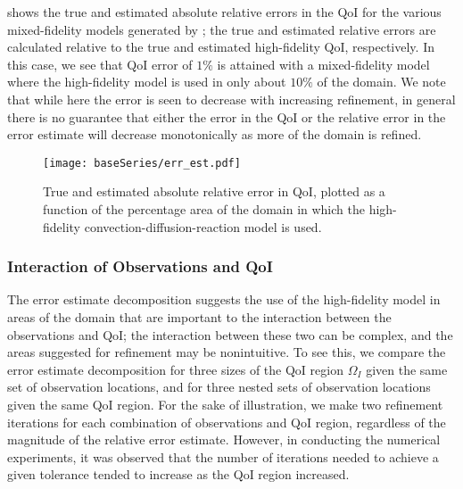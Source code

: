  shows the true and estimated absolute relative errors in the QoI for the various mixed-fidelity models generated by ; the true and estimated relative errors are calculated relative to the true and estimated high-fidelity QoI, respectively. In this case, we see that QoI error of $1\%$ is attained with a mixed-fidelity model where the high-fidelity model is used in only about $10\%$ of the domain. We note that while here the error is seen to decrease with increasing refinement, in general there is no guarantee that either the error in the QoI or the relative error in the error estimate will decrease monotonically as more of the domain is refined.
%
\begin{figure}[htbp]
\centering
\texttt{[image: baseSeries/err\_est.pdf]}
\caption{True and estimated absolute relative error in QoI, plotted as a function of the percentage area of the domain in which the high-fidelity convection-diffusion-reaction model is used.}
\label{fig:baseErr}
\end{figure}
%

\subsubsection{Interaction of Observations and QoI} \label{sec:qoivdata}
%
The error estimate decomposition suggests the use of the high-fidelity model in areas of the domain that are important to the interaction between the observations and QoI; the interaction between these two can be complex, and the areas suggested for refinement may be nonintuitive. To see this, we compare the error estimate decomposition for three sizes of the QoI region $\Omega_I$ given the same set of observation locations, and for three nested sets of observation locations given the same QoI region. For the sake of illustration, we make two refinement iterations for each combination of observations and QoI region, regardless of the magnitude of the relative error estimate. However, in conducting the numerical experiments, it was observed that the number of iterations needed to achieve a given tolerance tended to increase as the QoI region increased.

